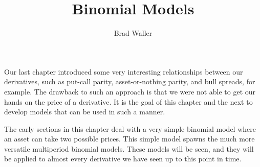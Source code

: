 \documentclass{ximera}
\title{Binomial Models}
\author{Brad Waller}
\begin{document}
\maketitle

Our last chapter introduced some very interesting relationships between our derivatives, such as put-call parity, asset-or-nothing parity, and bull spreads, for example. The drawback to such an approach is that we were not able to get our hands on the price of a derivative. It is the goal of this chapter and the next to develop models that can be used in such a manner. 

The early sections in this chapter deal with a very simple binomial model where an asset can take two possible prices. This simple model spawns the much more versatile multiperiod binomial models. These models will be seen, and they will be applied to almost every derivative we have seen up to this point in time.
\end{document}

